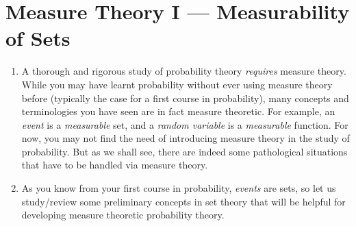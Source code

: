 \section{Measure Theory I --- Measurability of Sets}
\label{sect:set-measurability}
\begin{enumerate}
\item A thorough and rigorous study of probability theory \emph{requires}
measure theory. While you may have learnt probability without ever using
measure theory before (typically the case for a first course in probability),
many concepts and terminologies you have seen are in fact measure theoretic.
For example, an \emph{event} is a \emph{measurable} set, and a \emph{random
variable} is a \emph{measurable} function. For now, you may not find the need
of introducing measure theory in the study of probability. But as we shall see,
there are indeed some pathological situations that have to be handled via
measure theory.

\item As you know from your first course in probability, \emph{events} are
sets, so let us study/review some preliminary concepts in set theory that will
be helpful for developing measure theoretic probability theory.
\end{enumerate}
